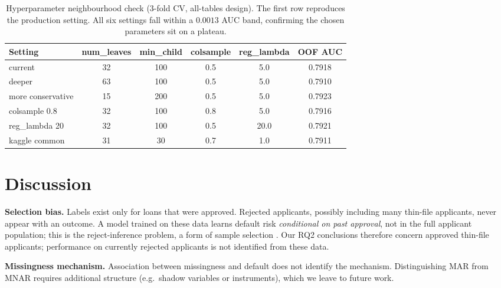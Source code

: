 \documentclass[10pt]{article}
\begin{document}
\begin{table}[t]\centering\small
\caption{Hyperparameter neighbourhood check (3-fold CV, all-tables design). The first row reproduces the production setting. All six settings fall within a $0.0013$ AUC band, confirming the chosen parameters sit on a plateau.}\label{tab:tuning}
\begin{tabular}{lcccc c}
\toprule
Setting & num\_leaves & min\_child & colsample & reg\_lambda & OOF AUC \\
\midrule
current           & 32 & 100 & 0.5 & 5.0  & 0.7918 \\
deeper            & 63 & 100 & 0.5 & 5.0  & 0.7910 \\
more conservative & 15 & 200 & 0.5 & 5.0  & 0.7923 \\
colsample 0.8     & 32 & 100 & 0.8 & 5.0  & 0.7916 \\
reg\_lambda 20    & 32 & 100 & 0.5 & 20.0 & 0.7921 \\
kaggle common     & 31 & 30  & 0.7 & 1.0  & 0.7911 \\
\bottomrule
\end{tabular}
\end{table}

\section{Discussion}
\textbf{Selection bias.} Labels exist only for loans that were approved. Rejected applicants, possibly including many thin-file applicants, never appear with an outcome. A model trained on these data learns default risk \emph{conditional on past approval}, not in the full applicant population; this is the reject-inference problem, a form of sample selection \citep{heckman1979sample,crook2004reject}. Our RQ2 conclusions therefore concern approved thin-file applicants; performance on currently rejected applicants is not identified from these data.

\textbf{Missingness mechanism.} Association between missingness and default does not identify the mechanism. Distinguishing MAR from MNAR requires additional structure (e.g.\ shadow variables or instruments), which we leave to future work.
\end{document}
